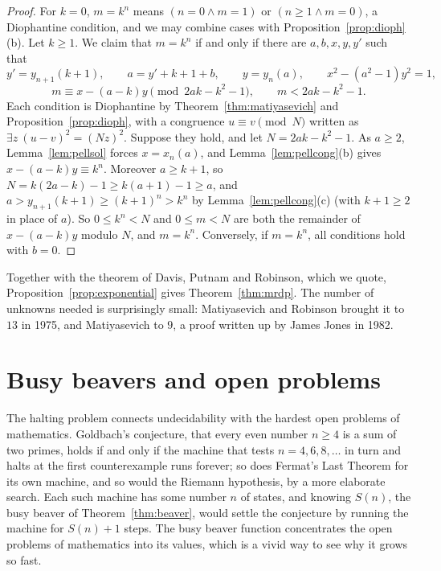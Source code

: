 \begin{proof}
For $k=0$, $m=k^n$ means $(n=0\wedge m=1)$ or $(n\ge1\wedge m=0)$, a Diophantine condition, and we may combine cases with Proposition~\ref{prop:dioph}(b). Let $k\ge1$. We claim that $m=k^n$ if and only if there are $a,b,x,y,y'$ such that
\[
y'=y_{n+1}(k+1),\qquad a=y'+k+1+b,\qquad y=y_n(a),\qquad x^2-(a^2-1)y^2=1,
\]
\[
m\equiv x-(a-k)y\pmod{2ak-k^2-1},\qquad m<2ak-k^2-1.
\]
Each condition is Diophantine by Theorem~\ref{thm:matiyasevich} and Proposition~\ref{prop:dioph}, with a congruence $u\equiv v\pmod N$ written as $\exists z\ (u-v)^2=(Nz)^2$. Suppose they hold, and let $N=2ak-k^2-1$. As $a\ge2$, Lemma~\ref{lem:pellsol} forces $x=x_n(a)$, and Lemma~\ref{lem:pellcong}(b) gives $x-(a-k)y\equiv k^n$. Moreover $a\ge k+1$, so $N=k(2a-k)-1\ge k(a+1)-1\ge a$, and $a>y_{n+1}(k+1)\ge(k+1)^n>k^n$ by Lemma~\ref{lem:pellcong}(c) (with $k+1\ge2$ in place of $a$). So $0\le k^n<N$ and $0\le m<N$ are both the remainder of $x-(a-k)y$ modulo $N$, and $m=k^n$. Conversely, if $m=k^n$, all conditions hold with $b=0$.
\end{proof}

Together with the theorem of Davis, Putnam and Robinson, which we quote, Proposition~\ref{prop:exponential} gives Theorem~\ref{thm:mrdp}. The number of unknowns needed is surprisingly small: Matiyasevich and Robinson brought it to $13$ in 1975, and Matiyasevich to $9$, a proof written up by James Jones in 1982.

\section{Busy beavers and open problems}\label{sec:openbeavers}

The halting problem connects undecidability with the hardest open problems of mathematics. Goldbach's conjecture, that every even number $n\ge4$ is a sum of two primes, holds if and only if the machine that tests $n=4,6,8,\dots$ in turn and halts at the first counterexample runs forever; so does Fermat's Last Theorem for its own machine, and so would the Riemann hypothesis, by a more elaborate search. Each such machine has some number $n$ of states, and knowing $S(n)$, the busy beaver of Theorem~\ref{thm:beaver}, would settle the conjecture by running the machine for $S(n)+1$ steps. The busy beaver function concentrates the open problems of mathematics into its values, which is a vivid way to see why it grows so fast.

